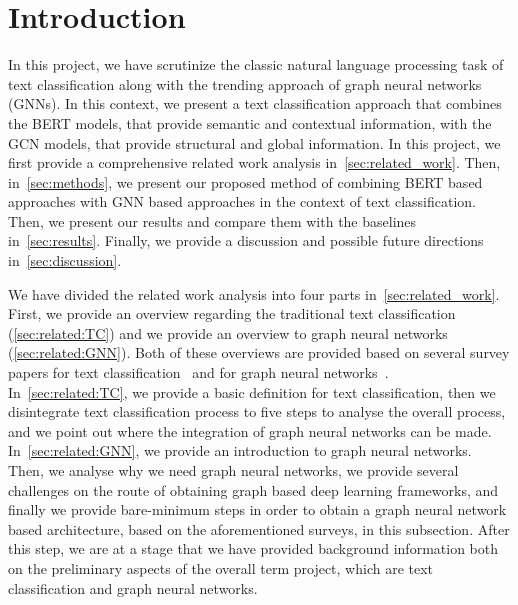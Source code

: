 \section{Introduction}
In this project, we have scrutinize the classic natural language processing task of text classification along with the trending approach of graph neural networks (GNNs). In this context, we present a text classification approach that combines the BERT models, that provide semantic and contextual information, with the GCN models, that provide structural and global information. In this project, we first provide a comprehensive related work analysis in~\cref{sec:related_work}. Then, in~\cref{sec:methods}, we present our proposed method of combining BERT based approaches with GNN based approaches in the context of text classification. Then, we present our results and compare them with the baselines in~\cref{sec:results}. Finally, we provide a discussion and possible future directions in~\cref{sec:discussion}.

We have divided the related work analysis into four parts in~\cref{sec:related_work}. First, we provide an overview regarding the traditional text classification (\cref{sec:related:TC}) and we provide an overview to graph neural networks (\cref{sec:related:GNN}). Both of these overviews are provided based on several survey papers for text classification~\autocite{kowsari19tc,li20tc,minaee20tc} and for graph neural networks~\autocite{zhou20gnn,wu21gnn,zhang18dlongraphs,sun18adversarial}. In~\cref{sec:related:TC}, we provide a basic definition for text classification, then we disintegrate text classification process to five steps to analyse the overall process, and we point out where the integration of graph neural networks can be made. In~\cref{sec:related:GNN}, we provide an introduction to graph neural networks. Then, we analyse why we need graph neural networks, we provide several challenges on the route of obtaining graph based deep learning frameworks, and finally we provide bare-minimum steps in order to obtain a graph neural network based architecture, based on the aforementioned surveys, in this subsection. After this step, we are at a stage that we have provided background information both on the preliminary aspects of the overall term project, which are text classification and graph neural networks.

